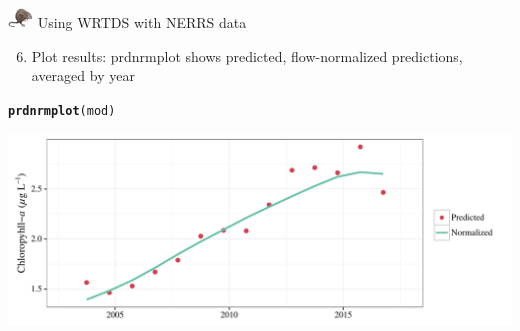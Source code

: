 \documentclass[xcolor=dvipsnames,serif]{beamer}\usepackage[]{graphicx}\usepackage[]{color}
\makeatletter
\def\maxwidth{ %
  \ifdim\Gin@nat@width>\linewidth
    \linewidth
  \else
    \Gin@nat@width
  \fi
}
\newcommand{\hlstd}[1]{\textcolor[rgb]{0.345,0.345,0.345}{#1}}%
\newcommand{\hlkwd}[1]{\textcolor[rgb]{0.737,0.353,0.396}{\textbf{#1}}}%
\newenvironment{kframe}{%
 \def\at@end@of@kframe{}%
 \ifinner\ifhmode%
  \def\at@end@of@kframe{\end{minipage}}%
  \begin{minipage}{\columnwidth}%
 \fi\fi%
 \def\FrameCommand##1{\hskip\@totalleftmargin \hskip-\fboxsep
 \colorbox{shadecolor}{##1}\hskip-\fboxsep
     \hskip-\linewidth \hskip-\@totalleftmargin \hskip\columnwidth}%
 \MakeFramed {\advance\hsize-\width
   \@totalleftmargin\z@ \linewidth\hsize
   \@setminipage}}%
 {\par\unskip\endMakeFramed%
 \at@end@of@kframe}
\newenvironment{knitrout}{}{} %
\makeatother
\begin{document}
\begin{frame}[t, fragile]{\includegraphics[width = 0.05\textwidth]{imgs/swmprat.png} Using WRTDS with NERRS data}{}
\begin{enumerate}
\setcounter{enumi}{5}
\item Plot results: prdnrmplot shows predicted, flow-normalized predictions, averaged by year
\end{enumerate}
\begin{knitrout}\scriptsize
{}\color{fgcolor}\begin{kframe}
\begin{alltt}
\hlkwd{prdnrmplot}\hlstd{(mod)}
\end{alltt}
\end{kframe}

{\centering \includegraphics[width=\maxwidth]{imgs/wrtdsplo2-1} 

}



\end{knitrout}
\end{frame}
\end{document}
